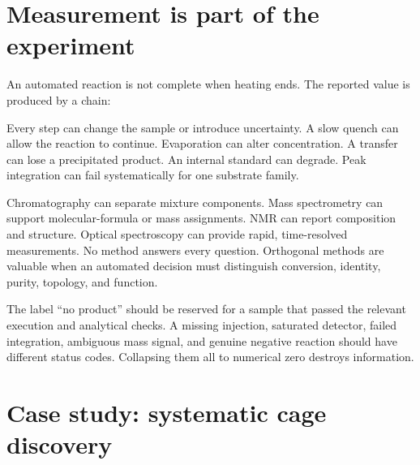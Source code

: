 \section{Measurement is part of the experiment}

An automated reaction is not complete when heating ends.
The reported value is produced by a chain:


Every step can change the sample or introduce uncertainty.
A slow quench can allow the reaction to continue.
Evaporation can alter concentration.
A transfer can lose a precipitated product.
An internal standard can degrade.
Peak integration can fail systematically for one substrate family.

Chromatography can separate mixture components.
Mass spectrometry can support molecular-formula or mass assignments.
NMR can report composition and structure.
Optical spectroscopy can provide rapid, time-resolved measurements.
No method answers every question.
Orthogonal methods are valuable when an automated decision must distinguish conversion, identity, purity, topology, and function.


The label ``no product'' should be reserved for a sample that passed the relevant execution and analytical checks.
A missing injection, saturated detector, failed integration, ambiguous mass signal, and genuine negative reaction should have different status codes.
Collapsing them all to numerical zero destroys information.

\section{Case study: systematic cage discovery}

